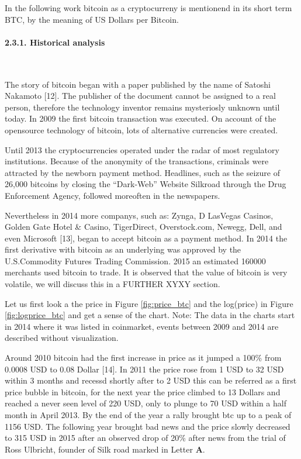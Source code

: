 \documentclass[
]{article}
\begin{document}
In the following work bitcoin as a cryptocurreny is mentionend in its
short term BTC, by the meaning of US Dollars per Bitcoin.

\hypertarget{historical-analysis}{%
\paragraph{2.3.1. Historical analysis}\label{historical-analysis}}

~

The story of bitcoin began with a paper published by the name of Satoshi
Nakamoto {[}12{]}. The publisher of the document cannot be assigned to a
real person, therefore the technology inventor remains mysteriosly
unknown until today. In 2009 the first bitcoin transaction was executed.
On account of the opensource technology of bitcoin, lots of alternative
currencies were created.

Until 2013 the cryptocurrencies operated under the radar of most
regulatory institutions. Because of the anonymity of the transactions,
criminals were attracted by the newborn payment method. Headlines, such
as the seizure of 26,000 bitcoins by closing the ``Dark-Web'' Website
Silkroad through the Drug Enforcement Agency, followed moreoften in the
newspapers.

Nevertheless in 2014 more companys, such as: Zynga, D LasVegas Casinos,
Golden Gate Hotel \& Casino, TigerDirect, Overstock.com, Newegg, Dell,
and even Microsoft {[}13{]}, began to accept bitcoin as a payment
method. In 2014 the first derivative with bitcoin as an underlying was
approved by the U.S.Commodity Futures Trading Commission. 2015 an
estimated 160000 merchants used bitcoin to trade. It is observed that
the value of bitcoin is very volatile, we will discuss this in a FURTHER
XYXY section.

Let us first look a the price in Figure \ref{fig:price_btc} and the
log(price) in Figure \ref{fig:logprice_btc} and get a sense of the
chart. Note: The data in the charts start in 2014 where it was listed in
coinmarket, events between 2009 and 2014 are described without
visualization.

Around 2010 bitcoin had the first increase in price as it jumped a 100\%
from 0.0008 USD to 0.08 Dollar {[}14{]}. In 2011 the price rose from 1
USD to 32 USD within 3 months and recessd shortly after to 2 USD this
can be referred as a first price bubble in bitcoin, for the next year
the price climbed to 13 Dollars and reached a never seen level of 220
USD, only to plunge to 70 USD within a half month in April 2013. By the
end of the year a rally brought btc up to a peak of 1156 USD. The
following year brought bad news and the price slowly decreased to 315
USD in 2015 after an observed drop of 20\% after news from the trial of
Ross Ulbricht, founder of Silk road marked in Letter \textbf{A}.
\end{document}
